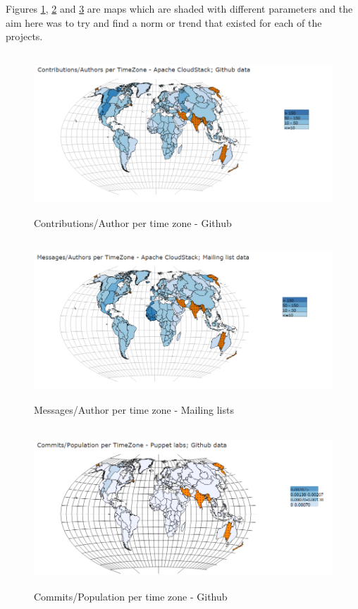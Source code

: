 \documentclass[seploa]{beavtex}
\begin{document}
Figures \ref{fig:div1}, \ref{fig:div2} and \ref{fig:div3} are maps which are shaded with different parameters and the aim here was to try and find a norm or trend that existed for each of the projects.

\begin{figure}[H]
\centering
\includegraphics[width=130mm,height=60mm]{image8.PNG}
\caption{Contributions/Author per time zone - Github}
\label{fig:div1}
\end{figure}

\begin{figure}[H]
\centering
\includegraphics[width=130mm,height=60mm]{image9.PNG}
\caption{Messages/Author per time zone - Mailing lists}
\label{fig:div2}
\end{figure}

\begin{figure}[H]
\centering
\includegraphics[width=130mm,height=60mm]{image10.PNG}
\caption{Commits/Population per time zone - Github}
\label{fig:div3}
\end{figure}
\end{document}
